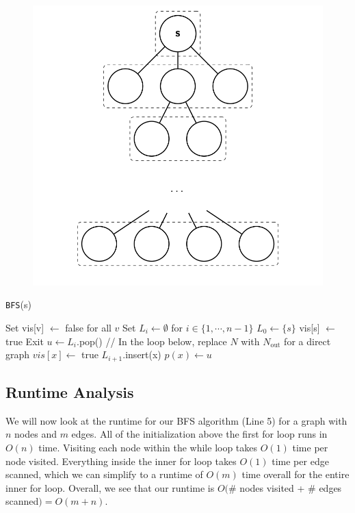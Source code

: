 \documentclass [12pt]{article}
\begin{document}
\begin{figure}[h!]
\centering
\includegraphics[scale=0.5]{bfs_layers.png}
\end{figure}

\begin{algorithm}
\caption{\texttt{BFS}(s)}
\label{alg:BFS_s}
\begin{algorithmic}
\STATE Set vis[v] $\gets$ false for all $v$
\STATE Set $L_i \gets \emptyset$ for $i \in \{1, \cdots, n-1\}$
\STATE $L_0 \gets \{ s \}$
vis[s] $\gets$ true
        \STATE Exit
    \ENDIF
        \STATE $u \gets L_i$.pop()
        \STATE // In the loop below, replace $N$ with $N_{\text{out}}$ for a direct graph
                \STATE $vis[x] \gets $ true
                \STATE $L_{i+1}$.insert(x)
                \STATE $p(x) \gets u$
            \ENDIF
        \ENDFOR
    \ENDWHILE
\ENDFOR
\end{algorithmic}
\end{algorithm}

\subsection{Runtime Analysis} 
We will now look at the runtime for our BFS algorithm (Line 5) for a graph with $n$ nodes and $m$ edges. All of the initialization above the first for loop runs in $O(n)$ time. Visiting each node within the while loop takes $O(1)$ time per node visited. Everything inside the inner for loop takes $O(1)$ time per edge scanned, which we can simplify to a runtime of $O(m)$ time overall for the entire inner for loop. Overall, we see that our runtime is $O($\# nodes visited + \# edges scanned$) = O(m + n)$.
\end{document}
